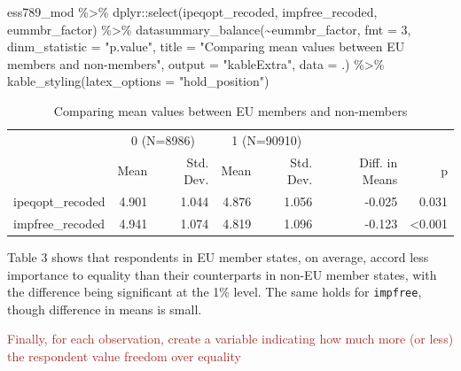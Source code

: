 \documentclass[
]{article}
\newenvironment{Shaded}{\begin{snugshade}}{\end{snugshade}}
\newcommand{\AttributeTok}[1]{\textcolor[rgb]{0.77,0.63,0.00}{#1}}
\newcommand{\DecValTok}[1]{\textcolor[rgb]{0.00,0.00,0.81}{#1}}
\newcommand{\FunctionTok}[1]{\textcolor[rgb]{0.00,0.00,0.00}{#1}}
\newcommand{\NormalTok}[1]{#1}
\newcommand{\SpecialCharTok}[1]{\textcolor[rgb]{0.00,0.00,0.00}{#1}}
\newcommand{\StringTok}[1]{\textcolor[rgb]{0.31,0.60,0.02}{#1}}
\begin{document}
\begin{Shaded}
\begin{Highlighting}[]
\NormalTok{ess789\_mod }\SpecialCharTok{\%\textgreater{}\%}
\NormalTok{  dplyr}\SpecialCharTok{::}\FunctionTok{select}\NormalTok{(ipeqopt\_recoded, impfree\_recoded, eummbr\_factor) }\SpecialCharTok{\%\textgreater{}\%}
  \FunctionTok{datasummary\_balance}\NormalTok{(}\SpecialCharTok{\textasciitilde{}}\NormalTok{eummbr\_factor, }\AttributeTok{fmt =} \DecValTok{3}\NormalTok{,}
                      \AttributeTok{dinm\_statistic =} \StringTok{"p.value"}\NormalTok{, }
                      \AttributeTok{title =} \StringTok{"Comparing mean values between EU members and non{-}members"}\NormalTok{,}
                      \AttributeTok{output =} \StringTok{"kableExtra"}\NormalTok{, }
                      \AttributeTok{data =}\NormalTok{ .) }\SpecialCharTok{\%\textgreater{}\%}
  \FunctionTok{kable\_styling}\NormalTok{(}\AttributeTok{latex\_options =} \StringTok{"hold\_position"}\NormalTok{)}
\end{Highlighting}
\end{Shaded}

\begin{table}[!h]

\caption{\label{tab:mean-equal-free-eu}Comparing mean values between EU members and non-members}
\centering
\begin{tabular}[t]{lrrrrrr}
\toprule
\multicolumn{1}{c}{ } & \multicolumn{2}{c}{0 (N=8986)} & \multicolumn{2}{c}{1 (N=90910)} & \multicolumn{2}{c}{ } \\
\cmidrule(l{3pt}r{3pt}){2-3} \cmidrule(l{3pt}r{3pt}){4-5}
  & Mean & Std. Dev. & Mean & Std. Dev. & Diff. in Means & p\\
\midrule
ipeqopt\_recoded & 4.901 & 1.044 & 4.876 & 1.056 & -0.025 & 0.031\\
impfree\_recoded & 4.941 & 1.074 & 4.819 & 1.096 & -0.123 & <0.001\\
\bottomrule
\end{tabular}
\end{table}

Table 3 shows that respondents in EU member states, on average, accord
less importance to equality than their counterparts in non-EU member
states, with the difference being significant at the 1\% level. The same
holds for \texttt{impfree}, though difference in means is small.

\textcolor{brown}{Finally, for each observation, create a variable indicating how much more (or less) the respondent value freedom over equality}
\end{document}
